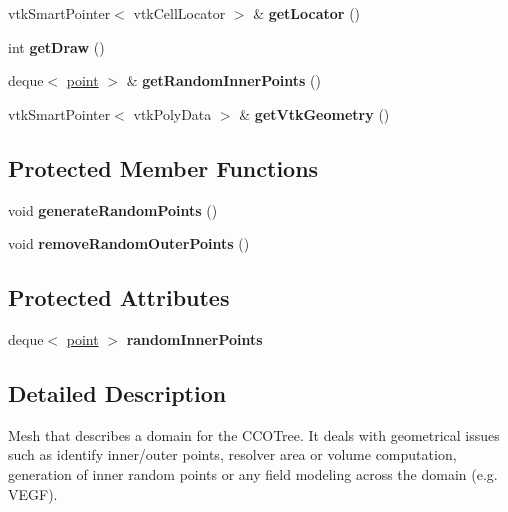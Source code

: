 \begin{DoxyCompactItemize}
vtk\+Smart\+Pointer$<$ vtk\+Cell\+Locator $>$ \& {\bfseries get\+Locator} ()
\item 
\mbox{\label{class_simple_domain_a25b8e92e59ae6ec5b5a463caf4d19882}} 
int {\bfseries get\+Draw} ()
\item 
\mbox{\label{class_simple_domain_acfe3e4aeaea246579b6102707d050bf0}} 
deque$<$ \mbox{\hyperlink{structpoint}{point}} $>$ \& {\bfseries get\+Random\+Inner\+Points} ()
\item 
\mbox{\label{class_simple_domain_a13f9ab047e641a022648ca6468651f9f}} 
vtk\+Smart\+Pointer$<$ vtk\+Poly\+Data $>$ \& {\bfseries get\+Vtk\+Geometry} ()
\end{DoxyCompactItemize}
\subsection*{Protected Member Functions}
\begin{DoxyCompactItemize}
\item 
\mbox{\label{class_simple_domain_a47fede50eae6301d9aab0024d0cc32fa}} 
void {\bfseries generate\+Random\+Points} ()
\item 
\mbox{\label{class_simple_domain_a2d3e15dd1f43edaffc0cc11376fd4d81}} 
void {\bfseries remove\+Random\+Outer\+Points} ()
\end{DoxyCompactItemize}
\subsection*{Protected Attributes}
\begin{DoxyCompactItemize}
\item 
\mbox{\label{class_simple_domain_a7b180aaf731d5809daf149025fb553d0}} 
deque$<$ \mbox{\hyperlink{structpoint}{point}} $>$ {\bfseries random\+Inner\+Points}
\end{DoxyCompactItemize}


\subsection{Detailed Description}
Mesh that describes a domain for the C\+C\+O\+Tree. It deals with geometrical issues such as identify inner/outer points, resolver area or volume computation, generation of inner random points or any field modeling across the domain (e.\+g. V\+E\+GF). 

